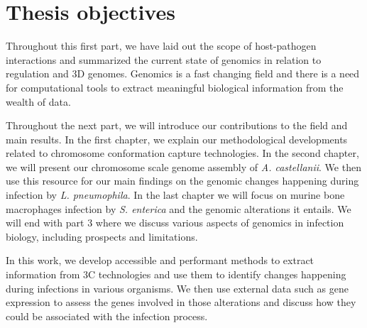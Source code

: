 
\chapter{Thesis objectives} %

\label{ch:01-04} %

Throughout this first part, we have laid out the scope of host-pathogen interactions and summarized the current state of genomics in relation to regulation and 3D genomes. Genomics is a fast changing field and there is a need for computational tools to extract meaningful biological information from the wealth of data.

Throughout the next part, we will introduce our contributions to the field and main results. In the first chapter, we explain our methodological developments related to chromosome conformation capture technologies. In the second chapter, we will present our chromosome scale genome assembly of \textit{A. castellanii}. We then use this resource for our main findings on the genomic changes happening during infection by \textit{L. pneumophila}. In the last chapter we will focus on murine bone macrophages infection by \textit{S. enterica} and the genomic alterations it entails. We will end with part 3 where we discuss various aspects of genomics in infection biology, including prospects and limitations.


In this work, we develop accessible and performant methods to extract information from 3C technologies and use them to identify changes happening during infections in various organisms. We then use external data such as gene expression to assess the genes involved in those alterations and discuss how they could be associated with the infection process.

